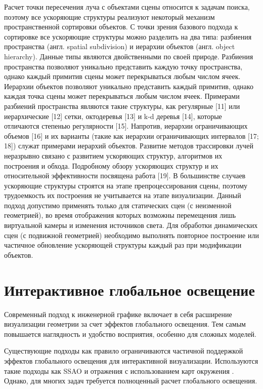 Расчет точки пересечения луча с объектами сцены относится к задачам поиска, поэтому все ускоряющие структуры реализуют некоторый механизм пространственной сортировки объектов. С точки зрения базового подхода к сортировке все ускоряющие структуры можно разделить на два типа: разбиения пространства (англ. spatial subdivision) и иерархии объектов (англ. object hierarchy). Данные типы являются двойственными по своей природе. Разбиения пространства позволяют уникально представить каждую точку пространства, однако каждый примитив сцены может перекрываться любым числом ячеек. Иерархии объектов позволяют уникально представить каждый примитив, однако каждая точка сцены может перекрываться любым числом ячеек. Примерами разбиений пространства являются такие структуры, как регулярные [11] или иерархические [12] сетки, октодеревья [13] и k-d деревья [14], которые отличаются степенью регулярности [15]. Напротив, иерархии ограничивающих объемов [16] и их варианты (такие как иерархии ограничивающих интервалов [17; 18]) служат примерами иерархий объектов. Развитие методов трассировки лучей неразрывно связано с развитием ускоряющих структур, алгоритмов их построения и обхода. Подробному обзору ускоряющих структур и их относительной эффективности посвящена работа [19].
В большинстве случаев ускоряющие структуры строятся на этапе препроцессирования сцены, поэтому трудоемкость их построения не учитывается на этапе визуализации. Данный подход допустимо применять только для статических сцен (с неизменной геометрией), во время отображения которых возможны перемещения лишь виртуальной камеры и изменения источников света. Для обработки динамических сцен (с подвижной геометрией) необходимо выполнять повторное построение или частичное обновление ускоряющей структуры каждый раз при модификации объектов.

\section{Интерактивное глобальное освещение} \label{sect_GI}

Современный подход к инженерной графике включает в себя расширение визуализации геометрии за счет эффектов глобального освещения. Тем самым повышается наглядность и удобство восприятия, особенно для сложных моделей.


Существующие подходы как правило ограничиваются частичной поддержкой эффектов глобального освещения для интерактивной визуализации. Используются такие подходы как SSAO и отражения с использованием карт окружения . Однако, для многих задач требуется полноценный расчет глобального освещения.

